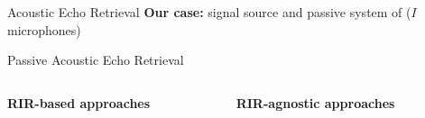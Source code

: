 \begin{frame}[t]{Acoustic Echo Retrieval \hfill\faBook}
    \vfill
    \textcolor{myred}{\textbf{Our case:} signal source and passive system of ($I$ microphones)}

\end{frame}

\begin{frame}[t]{\alert{Passive} Acoustic Echo Retrieval \hfill\faBook}

        \vspace{.5em}
        \begin{columns}[T,onlytextwidth] %
            \begin{column}{.48\textwidth}
                \textbf{RIR-\alert{based} approaches}
            \end{column}
            \begin{column}{.48\textwidth}
                \textbf{RIR-\alert{agnostic} approaches}
            \end{column}%
        \end{columns}


\end{frame}
